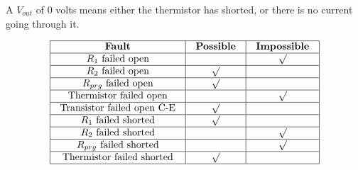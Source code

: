 





A $V_{out}$ of 0 volts means either the thermistor has shorted, or there is no current going through it.


$$\vbox{\offinterlineskip
\halign{\strut
\vrule \quad\hfil # \ \hfil & 
\vrule \quad\hfil # \ \hfil & 
\vrule \quad\hfil # \ \hfil \vrule \cr
\noalign{\hrule}
%
{\bf Fault} & {\bf Possible} & {\bf Impossible} \cr
%
\noalign{\hrule}
%
$R_1$ failed open &  & $\surd$ \cr
%
\noalign{\hrule}
%
$R_2$ failed open & $\surd$ &  \cr
%
\noalign{\hrule}
%
$R_{prg}$ failed open & $\surd$ &  \cr
%
\noalign{\hrule}
%
Thermistor failed open &  & $\surd$ \cr
%
\noalign{\hrule}
%
Transistor failed open C-E & $\surd$ &  \cr
%
\noalign{\hrule}
%
$R_1$ failed shorted & $\surd$ &  \cr
%
\noalign{\hrule}
%
$R_2$ failed shorted &  & $\surd$ \cr
%
\noalign{\hrule}
%
$R_{prg}$ failed shorted &  & $\surd$ \cr
%
\noalign{\hrule}
%
Thermistor failed shorted & $\surd$ &  \cr
%
\noalign{\hrule}
} %
}$$ %





